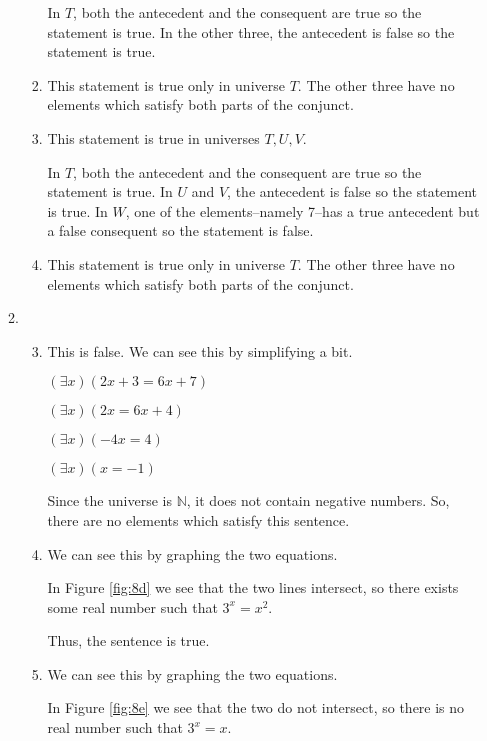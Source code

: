 \documentclass[12pt,letterpaper]{article}
\begin{document}
\begin{enumerate}
\begin{enumerate}
\begin{enumerate}
              In $T$, both the antecedent and the consequent are true so the statement is true.
              In the other three, the antecedent is false so the statement is true.
            \item
              This statement is true only in universe $T$.
              The other three have no elements which satisfy both parts of the conjunct.
            \item
              This statement is true in universes $T, U, V$.

              In $T$, both the antecedent and the consequent are true so the statement is true.
              In $U$ and $V$, the antecedent is false so the statement is true.
              In $W$, one of the elements--namely 7--has a true antecedent but a false consequent so the statement is false.
            \item
              This statement is true only in universe $T$.
              The other three have no elements which satisfy both parts of the conjunct.
          \end{enumerate}
        \setcounter{enumii}{7}
        \item
          \begin{enumerate}
            \setcounter{enumiii}{2}
            \item
              This is false.
              We can see this by simplifying a bit.

              $(\exists x)(2x + 3 = 6x + 7)$

              $(\exists x)(2x = 6x + 4)$

              $(\exists x)(-4x = 4)$

              $(\exists x)(x = -1)$

              Since the universe is $\mathbb{N}$,
              it does not contain negative numbers.
              So, there are no elements which satisfy this sentence.
            \item
              We can see this by graphing the two equations.

              In Figure \ref{fig:8d} we see that the two lines intersect,
              so there exists some real number such that $3^x = x^2$.

              Thus, the sentence is true.

            \item
              We can see this by graphing the two equations.

              In Figure \ref{fig:8e} we see that the two do not intersect,
              so there is no real number such that $3^x = x$.


\end{enumerate}
\end{enumerate}
\end{enumerate}
\end{document}
